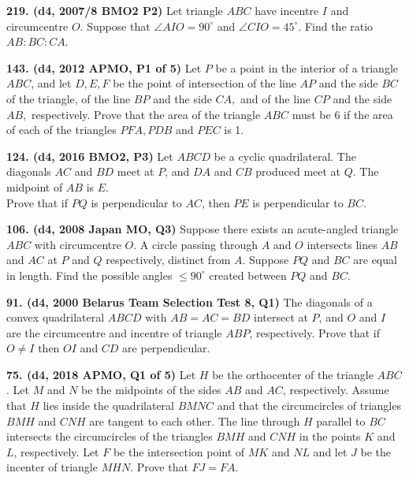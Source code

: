 \documentclass{article}
\begin{document}
\textbf{219. (\color{red}d4\color{black}, 2007/8 BMO2 P2)} Let triangle \(ABC\) have incentre \(I\) and circumcentre \(O\). Suppose that \(\angle AIO = 90^\circ\) and \(\angle CIO = 45^\circ\). Find the ratio \(AB:BC:CA\).

\textbf{143. (\color{red}d4\color{black}, 2012 APMO, P1 of 5)} Let \(P\) be a point in the interior of a triangle \(ABC\), and let \(D, E, F\) be the point of intersection of the line \(AP\) and the side \(BC\) of the triangle, of the line \(BP\) and the side \(CA,\) and of the line \(CP\) and the side \(AB,\) respectively. Prove that the area of the triangle \(ABC\) must be 6 if the area of each of the triangles \(PFA, PDB\) and \(PEC\) is 1.

\textbf{124. (\color{red}d4\color{black}, 2016 BMO2, P3)} Let \(ABCD\) be a cyclic quadrilateral. The diagonals \(AC\) and \(BD\) meet at \(P\), and \(DA\) and \(CB\) produced meet at \(Q\). The midpoint of \(AB\) is \(E\).\\

Prove that if \(PQ\) is perpendicular to \(AC\), then \(PE\) is perpendicular to \(BC\).

\textbf{106. (\color{red}d4\color{black}, 2008 Japan MO, Q3)} Suppose there exists an acute-angled triangle \(ABC\) with circumcentre \(O\). A circle passing through \(A\) and \(O\) intersects lines \(AB\) and \(AC\) at \(P\) and \(Q\) respectively, distinct from \(A\). Suppose \(PQ\) and \(BC\) are equal in length. Find the possible angles \(\leq 90^{\circ}\) created between \(PQ\) and \(BC\).

\textbf{91. (\color{red}d4\color{black}, 2000 Belarus Team Selection Test 8, Q1)} The diagonals of a convex quadrilateral \(ABCD\) with \(AB = AC = BD\) intersect at \(P\), and \(O\) and \(I\) are the circumcentre and incentre of triangle \(ABP\), respectively. Prove that if \(O \neq I\) then \(OI\) and \(CD\) are perpendicular.

\textbf{75. (\color{red}d4\color{black}, 2018 APMO, Q1 of 5)} Let $H$ be the orthocenter of the triangle $ABC$. Let $M$ and $N$ be the midpoints of the sides $AB$ and $AC$, respectively. Assume that $H$ lies inside the quadrilateral $BMNC$ and that the circumcircles of triangles $BMH$ and $CNH$ are tangent to each other. The line through $H$ parallel to $BC$ intersects the circumcircles of the triangles $BMH$ and $CNH$ in the points $K$ and $L$, respectively. Let $F$ be the intersection point of $MK$ and $NL$ and let $J$ be the incenter of triangle $MHN$. Prove that $FJ = FA$.
\end{document}
